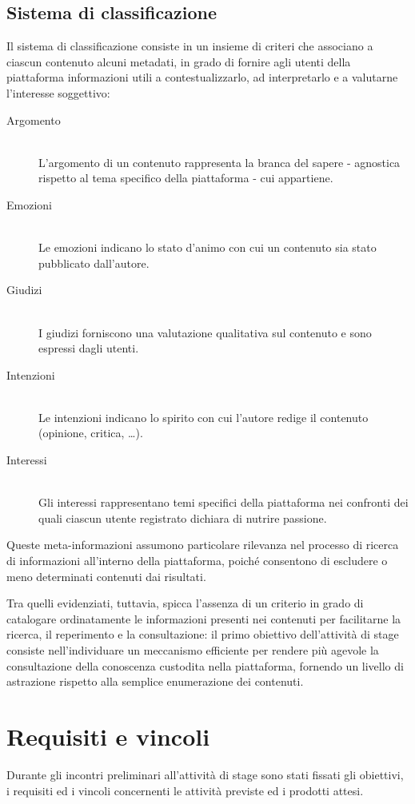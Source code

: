 \subsection{Sistema di classificazione}
\label{sec:tesi:progetto:classificazione}
Il sistema di classificazione consiste in un insieme di criteri che associano a ciascun contenuto alcuni metadati, in grado di fornire agli utenti della piattaforma informazioni utili a contestualizzarlo, ad interpretarlo e a valutarne l'interesse soggettivo:
\begin{description}
 	\item[Argomento] \hfill \\
 	L'argomento di un contenuto rappresenta la branca del sapere - agnostica rispetto al tema specifico della piattaforma - cui appartiene. 
 	\item[Emozioni] \hfill \\
 	Le emozioni indicano lo stato d'animo con cui un contenuto sia stato pubblicato dall'autore.
 	\item[Giudizi] \hfill \\
 	I giudizi forniscono una valutazione qualitativa sul contenuto e sono espressi dagli utenti.
 	\item[Intenzioni] \hfill \\
 	Le intenzioni indicano lo spirito con cui l'autore redige il contenuto (opinione, critica, \ldots).
 	\item[Interessi] \hfill \\
 	Gli interessi rappresentano temi specifici della piattaforma nei confronti dei quali ciascun utente registrato dichiara di nutrire passione.
\end{description}

Queste meta-informazioni assumono particolare rilevanza nel processo di ricerca di informazioni all'interno della piattaforma, poiché consentono di escludere o meno determinati contenuti dai risultati.

Tra quelli evidenziati, tuttavia, spicca l'assenza di un criterio in grado di catalogare ordinatamente le informazioni presenti nei contenuti per facilitarne la ricerca, il reperimento e la consultazione: il primo obiettivo dell'attività di stage consiste nell'individuare un meccanismo efficiente per rendere più agevole la consultazione della conoscenza custodita nella piattaforma, fornendo un livello di astrazione rispetto alla semplice enumerazione dei contenuti.

\section{Requisiti e vincoli}
\label{sec:tesi:progetto:requisiti}
Durante gli incontri preliminari all'attività di stage sono stati fissati gli obiettivi, i requisiti ed i vincoli concernenti le attività previste ed i prodotti attesi. 

